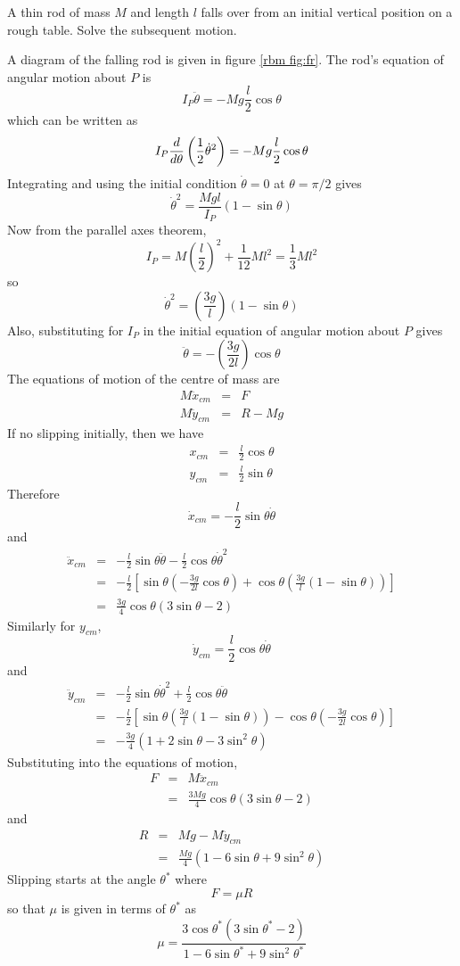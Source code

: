 \begin{example}
\problem
A thin rod of mass $M$ and length $l$ falls over from an initial vertical
position on a rough table.  Solve the subsequent motion.

\solution
A diagram of the falling rod is given in figure \ref{rbm fig:fr}.  The rod's
equation of angular motion about $P$ is
$$I_P\ddot{\theta}=-Mg\frac{l}{2}\cos\theta$$
which can be written as
$$I_P\frac{d}{d{\theta}}\left(\frac{1}{2}\dot{\theta}^2\right)=-Mg\frac{l}{2}
\cos\theta$$
Integrating and using the initial condition $\dot{\theta}=0$ at $\theta=\pi/2$
gives
$$\dot{\theta}^2=\frac{Mgl}{I_P}(1-\sin\theta)$$
Now from the parallel axes theorem, 
$$I_P=M\left(\frac{l}{2}\right)^2+\frac{1}{12}Ml^2=\frac{1}{3}Ml^2$$
so
$$\dot{\theta}^2=\left(\frac{3g}{l}\right)(1-\sin\theta)$$
Also, substituting for $I_P$ in the initial equation of angular motion
about $P$ gives
$$\ddot{\theta}=-\left(\frac{3g}{2l}\right)\cos\theta$$
The equations of motion of the centre of mass are
\begin{eqnarray*}
M\ddot{x}_{cm}&=&F\\
M\ddot{y}_{cm}&=&R-Mg
\end{eqnarray*}
If no slipping initially, then we have
\begin{eqnarray*}
x_{cm}&=&\frac{l}{2}\cos\theta\\
y_{cm}&=&\frac{l}{2}\sin\theta
\end{eqnarray*}
Therefore
$$\dot{x}_{cm}=-\frac{l}{2}\sin\theta\dot{\theta}$$
and
\begin{eqnarray*}
\ddot{x}_{cm}&=&-\frac{l}{2}\sin\theta\ddot{\theta}
-\frac{l}{2}\cos\theta\dot{\theta}^2 \\
&=&-\frac{l}{2}\left[
\sin\theta\left(-\frac{3g}{2l}\cos\theta\right)
+\cos\theta\left(\frac{3g}{l}(1-\sin\theta)\right)\right]\\
&=&\frac{3g}{4}\cos\theta(3\sin\theta-2)
\end{eqnarray*}
Similarly for $y_{cm}$,
$$\dot{y}_{cm}=\frac{l}{2}\cos\theta\dot{\theta}$$
and
\begin{eqnarray*}
\ddot{y}_{cm}&=&-\frac{l}{2}\sin\theta\dot{\theta}^2
+\frac{l}{2}\cos\theta\ddot{\theta} \\
&=&-\frac{l}{2}\left[
\sin\theta\left(\frac{3g}{l}(1-\sin\theta)\right)
-\cos\theta\left(-\frac{3g}{2l}\cos\theta\right)\right]\\
&=&-\frac{3g}{4}(1+2\sin\theta-3\sin^2\theta)
\end{eqnarray*}
Substituting into the equations of motion,
\begin{eqnarray*}
F &=& M\ddot{x}_{cm}\\
&=&\frac{3Mg}{4}\cos\theta(3\sin\theta-2)
\end{eqnarray*}
and
\begin{eqnarray*}
R&=&Mg-M\ddot{y}_{cm}\\
&=&\frac{Mg}{4}(1-6\sin\theta+9\sin^2\theta)
\end{eqnarray*}
Slipping starts at the angle $\theta^*$ where
$$F=\mu R$$
so that $\mu$ is given in terms of $\theta^*$ as
$$\mu=
\frac{3\cos\theta^*(3\sin\theta^*-2)}{1-6\sin\theta^*+9\sin^2\theta^*}$$
\end{example}
